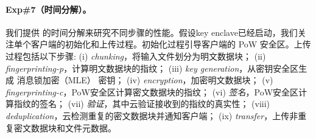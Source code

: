 \paragraph*{Exp\#7（时间分解）。} 我们提供 \sysnameS 的时间分解来研究不同步骤的性能。假设key enclave已经启动，我们关注单个客户端的初始化和上传过程。初始化过程引导客户端的 PoW 安全区。上传过程包括以下步骤: (i) \textit{ chunking}，将输入文件划分为明文数据块； (ii) \textit{ fingerprinting-p}，计算明文数据块的指纹； (iii) \textit{ key generation}，从密钥安全区生成 消息锁加密（MLE） 密钥； (iv) \textit{ encryption}，加密明文数据块； (v) \textit{ fingerprinting-c}，PoW安全区计算密文数据块的指纹； (vi) \textit{ 签名}，PoW安全区计算指纹的签名； (vii) \textit{ 验证}，其中云验证接收到的指纹的真实性； (viii) \textit{ deduplication}，云检测重复的密文数据块并通知客户端； (ix) \textit{ transfer}，上传非重复密文数据块和文件元数据。



